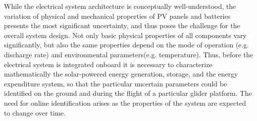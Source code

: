 \documentclass{ifacconf}
\begin{document}
While the electrical system architecture is conceptually well-understood, the
variation of physical and mechanical properties of PV panels and batteries
presents the most significant uncertainty, and thus poses the challenge for
the overall system design. Not only basic physical properties of all
components vary significantly, but also the same properties depend on the
mode of operation (e.g. discharge rate) and environmental parameters(e.g.
temperature). Thus, before the electrical system is integrated onboard it is
necessary to characterize mathematically the solar-powered energy generation,
storage, and the energy expenditure system, so that the particular uncertain
parameters could be identified on the ground and during the flight of a
particular glider platform. The need for online identification arises as the
properties of the system are expected to change over time.
\end{document}

